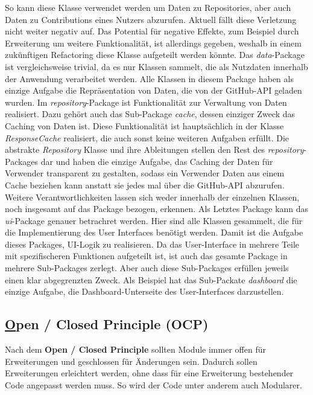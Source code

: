 So kann diese Klasse verwendet werden um Daten zu Repositories, aber auch Daten zu Contributions eines Nutzers abzurufen.
Aktuell fällt diese Verletzung nicht weiter negativ auf.
Das Potential für negative Effekte, zum Beispiel durch Erweiterung um weitere Funktionalität, ist allerdings gegeben, weshalb in einem zukünftigen Refactoring diese Klasse aufgeteilt werden könnte.
\newline
Das \textit{data}-Package ist vergleichsweise trivial, da es nur Klassen sammelt, die als Nutzdaten innerhalb der Anwendung verarbeitet werden.
Alle Klassen in diesem Package haben als einzige Aufgabe die Repräsentation von Daten, die von der GitHub-API geladen wurden.
\newline
Im \textit{repository}-Package ist Funktionalität zur Verwaltung von Daten realisiert.
Dazu gehört auch das Sub-Package \textit{cache}, dessen einziger Zweck das Caching von Daten ist.
Diese Funktionalität ist hauptsächlich in der Klasse \textit{ResponseCache} realisiert, die auch sonst keine weiteren Aufgaben erfüllt.
Die abstrakte \textit{Repository} Klasse und ihre Ableitungen stellen den Rest des \textit{repository}-Packages dar und haben die einzige Aufgabe, das Caching der Daten für Verwender transparent zu gestalten, sodass ein Verwender Daten aus einem Cache beziehen kann anstatt sie jedes mal über die GitHub-API abzurufen.
Weitere Verantwortlichkeiten lassen sich weder innerhalb der einzelnen Klassen, noch insgesamt auf das Package bezogen, erkennen.
\newline
Als Letztes Package kann das \textit{ui}-Package genauer betrachret werden.
Hier sind alle Klassen gesammelt, die für die Implementierung des User Interfaces benötigt werden.
Damit ist die Aufgabe dieses Packages, UI-Logik zu realisieren.
Da das User-Interface in mehrere Teile mit spezifischeren Funktionen aufgeteilt ist, ist auch das gesamte Package in mehrere Sub-Packages zerlegt.
Aber auch diese Sub-Packages erfüllen jeweils einen klar abgegrenzten Zweck.
Als Beispiel hat das Sub-Packate \textit{dashboard} die einzige Aufgabe, die Dashboard-Unterseite des User-Interfaces darzustellen.


\newpage
\subsection{\underline{O}pen / Closed Principle (OCP)}

Nach dem \textbf{Open / Closed Principle} sollten Module immer offen für Erweiterungen und geschlossen für Änderungen sein.
Dadurch sollen Erweiterungen erleichtert werden, ohne dass für eine Erweiterung bestehender Code angepasst werden muss.
So wird der Code unter anderem auch Modularer.


